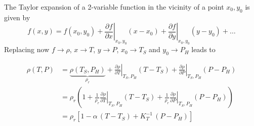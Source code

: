 \documentclass[a4paper]{article}
\begin{document}
The Taylor expansion of a 2-variable function in the vicinity of a point $x_0,y_0$ is given by
\[
f(x,y) = f(x_0,y_0) 
+ \left. \frac{\partial f}{\partial x}\right|_{x_0,y_0} (x-x_0)
+ \left. \frac{\partial f}{\partial y}\right|_{x_0,y_0} (y-y_0) + \dots
\]
Replacing now $f \rightarrow \rho$, $x \rightarrow T$,  $y \rightarrow P$,  
$x_0 \rightarrow T_S$ and 
$y_0 \rightarrow P_H$ leads to 

\begin{align}
\rho(T,P)
  &= \underbrace{\rho(T_S,P_H)}_{\rho_r}
   + \left.\frac{\partial \rho}{\partial T}\right|_{T_S,P_H} (T-T_S)
   + \left.\frac{\partial \rho}{\partial P}\right|_{T_S,P_H} (P-P_H) \nonumber \\
  &= \rho_r \left( 1
   + \frac{1}{\rho_r}\left.\frac{\partial \rho}{\partial T}\right|_{T_S,P_H} (T-T_S)
   + \frac{1}{\rho_r}\left.\frac{\partial \rho}{\partial P}\right|_{T_S,P_H} (P-P_H) \right) \nonumber \\
  &= \rho_r \left[ 1 - \alpha\,(T-T_S) + K_T^{-1}\,(P-P_H) \right]
  \label{eq:eq_state}
\end{align}
\end{document}

